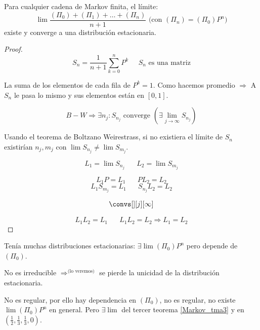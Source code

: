 \begin{theorem}[Teorema 3]
	\label{Markov_tma3}
	Para cualquier cadena de Markov finita, el límite:
	\[\lim \frac{(\Pi_0)+(\Pi_1)+…+(\Pi_n)}{n+1}  \text{ (con }(\Pi_n) = (\Pi_0)P^n\text{)}\]
	existe y converge a una distribución estacionaria.

\end{theorem}

\begin{proof}

	$$ S_n = \frac{1}{n+1} \sum\limits^{n}_{k=0} P^k \;\;\;\;\; S_n \text{ es una matriz} $$

	La suma de los elementos de cada fila de $P^k = 1$. Como hacemos promedio $\Rightarrow$ A $S_n$ le pasa lo mismo y sus elementos están en $[0,1]$.

	$$B-W \Rightarrow \exists n_j : S_{n_j} \text{ converge } (\exists \lim_{j \rightarrow \infty} S_{n_j})$$

	Usando el teorema de Boltzano Weirestrass, si no existiera el límite de $S_n$ existirían $n_j, m_j$ con $\lim S_{n_j} \neq \lim S_{m_j}$.

	$$L_1 = \lim S_{n_j} \;\;\;\;\;\; L_2 = \lim S_{m_j}$$

	$$L_1 P = L_1 \;\;\;\;\;\; P L_2 = L_2$$
	$$L_1 S_{m_j} = L_1 \;\;\;\;\;\; S_{n_j} L_2 = L_2$$

	$$ \convs[][j][\infty] $$

	$$L_1 L_2 = L_1 \;\;\;\;\;\; L_1L_2 = L_2 \Rightarrow L_1 = L_2 $$

\end{proof}

\begin{example}

\begin{center}
\end{center}

Tenía muchas distribuciones estacionarias: $\exists \lim(\Pi_0)P^n$ pero depende de $(\Pi_0)$.

No es irreducible $\Rightarrow^{\text{(lo veremos)}}$ se pierde la unicidad de la distribución estacionaria.

\end{example}

\begin{example}

\begin{center}
\end{center}

No es regular, por ello hay dependencia en $(\Pi_0)$, no es regular, no existe $\lim(\Pi_0) P^n$ en general. Pero $\exists \lim$ del tercer teorema \ref{Markov_tma3} y en $\left(\frac{1}{2},\frac{1}{3},\frac{1}{3},0\right)$.

\end{example}


